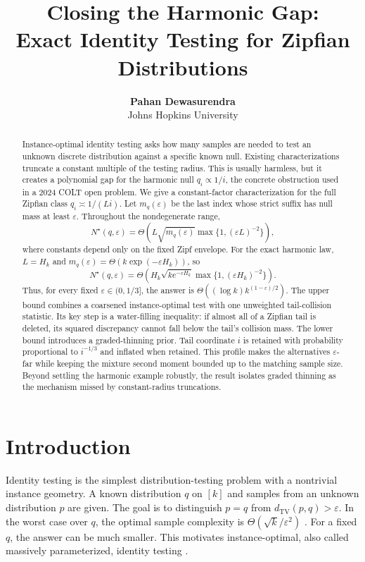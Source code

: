 \documentclass{article}
\title{Closing the Harmonic Gap:\\
Exact Identity Testing for Zipfian Distributions}
\author{\textbf{Pahan Dewasurendra} \\ Johns Hopkins University}
\newcommand{\TV}{d_{\mathrm{TV}}}
\newcommand{\1}{\mathbf 1}
\newcommand{\Nstar}{N^\star}
\begin{document}
\maketitle

\begin{abstract}
Instance-optimal identity testing asks how many samples are needed to test an unknown discrete distribution against a specific known null. Existing characterizations truncate a constant multiple of the testing radius. This is usually harmless, but it creates a polynomial gap for the harmonic null $q_i\propto1/i$, the concrete obstruction used in a 2024 COLT open problem. We give a constant-factor characterization for the full Zipfian class $q_i\asymp1/(Li)$. Let $m_q(\varepsilon)$ be the last index whose strict suffix has null mass at least $\varepsilon$. Throughout the nondegenerate range, \[ \Nstar(q,\varepsilon) =\Theta\!\left(L\sqrt{m_q(\varepsilon)} \max\{1,(\varepsilon L)^{-2}\}\right), \] where constants depend only on the fixed Zipf envelope. For the exact harmonic law, $L=H_k$ and $m_q(\varepsilon)=\Theta(k\exp(-\varepsilon H_k))$, so \[ \Nstar(q,\varepsilon) =\Theta\!\left(H_k\sqrt{k e^{-\varepsilon H_k}} \max\{1,(\varepsilon H_k)^{-2}\}\right). \] Thus, for every fixed $\varepsilon\in(0,1/3]$, the answer is $\Theta((\log k)k^{(1-\varepsilon)/2})$. The upper bound combines a coarsened instance-optimal test with one unweighted tail-collision statistic. Its key step is a water-filling inequality: if almost all of a Zipfian tail is deleted, its squared discrepancy cannot fall below the tail's collision mass. The lower bound introduces a graded-thinning prior. Tail coordinate $i$ is retained with probability proportional to $i^{-1/3}$ and inflated when retained. This profile makes the alternatives $\varepsilon$-far while keeping the mixture second moment bounded up to the matching sample size. Beyond settling the harmonic example robustly, the result isolates graded thinning as the mechanism missed by constant-radius truncations.
\end{abstract}

\section{Introduction}

Identity testing is the simplest distribution-testing problem with a nontrivial instance geometry. A known distribution $q$ on $[k]$ and samples from an unknown distribution $p$ are given. The goal is to distinguish $p=q$ from $\TV(p,q)>\varepsilon$. In the worst case over $q$, the optimal sample complexity is $\Theta(\sqrt{k}/\varepsilon^2)$ \citep{paninski2008coincidence,diakonikolas2018highprob}. For a fixed $q$, the answer can be much smaller. This motivates instance-optimal, also called massively parameterized, identity testing \citep{valiant2017automatic,goldreich2017property}.
\end{document}
